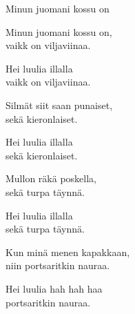 \begin{song}{Minun juomani kossu on}

    \begin{repetition}
        Minun juomani kossu on,\\
        vaikk on viljaviinaa.
    \end{repetition}
    \begin{repetition}
        Hei luulia illalla\\
        vaikk on viljaviinaa.
    \end{repetition}
    \begin{repetition}
        Silmät siit saan punaiset,\\
        sekä kieronlaiset.\\
    \end{repetition}
    \begin{repetition}
        Hei luulia illalla\\
        sekä kieronlaiset.
    \end{repetition}

    \begin{repetition}
        Mullon räkä poskella,\\
        sekä turpa täynnä.\\
    \end{repetition}
    \begin{repetition}
        Hei luulia illalla\\
        sekä turpa täynnä.
    \end{repetition}

    \begin{repetition}
        Kun minä menen kapakkaan,\\
        niin portsaritkin nauraa.
    \end{repetition}
    \begin{repetition}
        Hei luulia hah hah haa\\
        portsaritkin nauraa.
    \end{repetition}

\end{song}